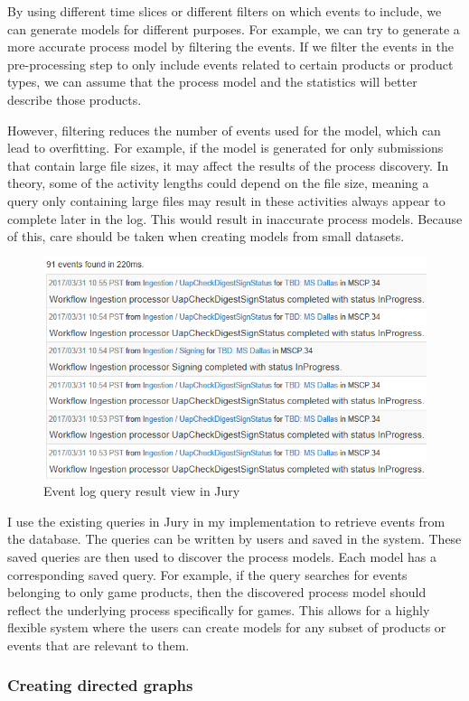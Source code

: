 By using different time slices or different filters on which events to include, we can generate models for different purposes. 
For example, we can try to generate a more accurate process model by filtering the events.
If we filter the events in the pre-processing step to only include events related to certain products
or product types, we can assume that the process model and the statistics will better describe those products.

However, filtering reduces the number of events used for the model, which can lead to overfitting.
For example, if the model is generated for only submissions that contain large file sizes, it may affect the results of the process discovery. 
In theory, some of the activity lengths could depend on the file size, meaning a query only containing large files may result in these activities always appear to complete later in the log.
This would result in inaccurate process models.
Because of this, care should be taken when creating models from small datasets.

\begin{figure}[htb]
    \centering \includegraphics[width=0.7\linewidth]{gfx/screenshots/plaineventlog.png}
    \caption{Event log query result view in Jury}
    \label{fig:plaineventlog}
\end{figure}

I use the existing queries in Jury in my implementation to retrieve events from the database. 
The queries can be written by users and saved in the system.
These saved queries are then used to discover the process models.
Each model has a corresponding saved query.
For example, if the query searches for events belonging to only game products, 
then the discovered process model should reflect the underlying process specifically for games.
This allows for a highly flexible system where the users can create models for any subset of products or events that are relevant to them. 

\subsubsection{Creating directed graphs}


